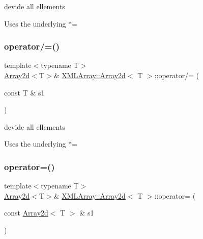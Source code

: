 devide all ellements 

Uses the underlying $\ast$= \mbox{\label{classXMLArray_1_1Array2d_aa699e2de82efb77e8e5e875a63eb7d8b}} 
\subsubsection{\texorpdfstring{operator/=()}{operator/=()}\hspace{0.1cm}{\footnotesize\ttfamily [4/4]}}
{\footnotesize\ttfamily template$<$typename T$>$ \\
\mbox{\hyperlink{classXMLArray_1_1Array2d}{Array2d}}$<$T$>$\& \mbox{\hyperlink{classXMLArray_1_1Array2d}{X\+M\+L\+Array\+::\+Array2d}}$<$ T $>$\+::operator/= (\begin{DoxyParamCaption}\item[{const T \&}]{s1 }\end{DoxyParamCaption})\hspace{0.3cm}{\ttfamily [inline]}}



devide all ellements 

Uses the underlying $\ast$= \mbox{\label{classXMLArray_1_1Array2d_a9fafd7ae228834d56b08fb5b1485eba4}} 
\subsubsection{\texorpdfstring{operator=()}{operator=()}\hspace{0.1cm}{\footnotesize\ttfamily [1/4]}}
{\footnotesize\ttfamily template$<$typename T$>$ \\
\mbox{\hyperlink{classXMLArray_1_1Array2d}{Array2d}}$<$T$>$\& \mbox{\hyperlink{classXMLArray_1_1Array2d}{X\+M\+L\+Array\+::\+Array2d}}$<$ T $>$\+::operator= (\begin{DoxyParamCaption}\item[{const \mbox{\hyperlink{classXMLArray_1_1Array2d}{Array2d}}$<$ T $>$ \&}]{s1 }\end{DoxyParamCaption})\hspace{0.3cm}{\ttfamily [inline]}}



